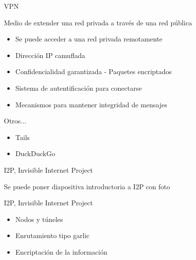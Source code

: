 \documentclass[spanish]{beamer}
\begin{document}
\begin{frame}{VPN}

Medio de extender una red privada a través de una red pública

\vspace{1.9em}

\begin{itemize}
	\item Se puede acceder a una red privada remotamente \\
	\item Dirección IP camuflada \\ 
	\item Confidencialidad garantizada - Paquetes encriptados \\
	\item Sistema de autentificación para conectarse
	\item Mecanismos para mantener integridad de mensajes
\end{itemize}	

\end{frame}






\begin{frame}{Otros...}

\begin{itemize}
	\item Tails %
	\item DuckDuckGo
\end{itemize}

\begin{figure}[h]
	\centering
\end{figure}

\end{frame}



\begin{frame}{I2P, Invisible Internet Project}
	
Se puede poner diapositiva introductoria a I2P con foto	
	
\end{frame}




\begin{frame}{I2P, Invisible Internet Project}
	
	
\begin{itemize}
	\item Nodos y túneles
	\item Enrutamiento tipo garlic
	\item Encriptación de la información
\end{itemize}	
	
\end{frame}
\end{document}
